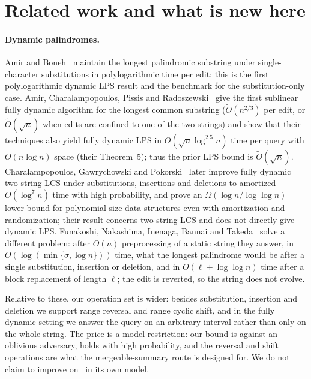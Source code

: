 ﻿\documentclass[11pt]{article}
\theoremstyle{plain}
\theoremstyle{remark}
\begin{document}
\begin{itemize}
\end{itemize}

\section{Related work and what is new here}\label{sec:related}
\paragraph{Dynamic palindromes.} Amir and Boneh~\cite{AB19} maintain the longest palindromic substring under single-character substitutions in polylogarithmic time per edit; this is the first polylogarithmic dynamic LPS result and the benchmark for the substitution-only case. Amir, Charalampopoulos, Pissis and Radoszewski~\cite{ACPR18} give the first sublinear fully dynamic algorithm for the longest common substring ($\tilde O(n^{2/3})$ per edit, or $\tilde O(\sqrt n)$ when edits are confined to one of the two strings) and show that their techniques also yield fully dynamic LPS in $O(\sqrt n\log^{2.5}n)$ time per query with $O(n\log n)$ space (their Theorem~5); thus the prior LPS bound is $\tilde O(\sqrt n)$. Charalampopoulos, Gawrychowski and Pokorski~\cite{CGP20} later improve fully dynamic two-string LCS under substitutions, insertions and deletions to amortized $O(\log^7n)$ time with high probability, and prove an $\Omega(\log n/\log\log n)$ lower bound for polynomial-size data structures even with amortization and randomization; their result concerns two-string LCS and does not directly give dynamic LPS. Funakoshi, Nakashima, Inenaga, Bannai and Takeda~\cite{FNIBT} solve a different problem: after $O(n)$ preprocessing of a static string they answer, in $O(\log(\min\{\sigma,\log n\}))$ time, what the longest palindrome would be after a single substitution, insertion or deletion, and in $O(\ell+\log\log n)$ time after a block replacement of length $\ell$; the edit is reverted, so the string does not evolve.

Relative to these, our operation set is wider: besides substitution, insertion and deletion we support range reversal and range cyclic shift, and in the fully dynamic setting we answer the query on an arbitrary interval rather than only on the whole string. The price is a model restriction: our bound is against an oblivious adversary, holds with high probability, and the reversal and shift operations are what the mergeable-summary route is designed for. We do not claim to improve on~\cite{AB19} in its own model.
\end{document}
